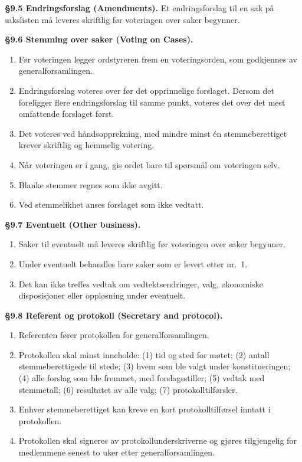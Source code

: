 \documentclass{../../../Common/Latex/Templates/rapport}
\begin{document}
\textbf{\S 9.5 Endringsforslag (Amendments).}\label{bylaw:9.5} Et endringsforslag til en sak på sakslisten må leveres skriftlig før voteringen over saker begynner.

\textbf{\S 9.6 Stemming over saker (Voting on Cases).}\label{bylaw:9.6}
\begin{enumerate}
  \item Før voteringen legger ordstyreren frem en voteringsorden, som godkjennes av generalforsamlingen.
  \item Endringsforslag voteres over før det opprinnelige forslaget. Dersom det foreligger flere endringsforslag til samme punkt, voteres det over det mest omfattende forslaget først.
  \item Det voteres ved håndsopprekning, med mindre minst én stemmeberettiget krever skriftlig og hemmelig votering.
  \item Når voteringen er i gang, gis ordet bare til spørsmål om voteringen selv.
  \item Blanke stemmer regnes som ikke avgitt.
  \item Ved stemmelikhet anses forslaget som ikke vedtatt.
\end{enumerate}

\textbf{\S 9.7 Eventuelt (Other business).}\label{bylaw:9.7}
\begin{enumerate}
  \item Saker til eventuelt må leveres skriftlig før voteringen over saker begynner.
  \item Under eventuelt behandles bare saker som er levert etter nr.\ 1.
  \item Det kan ikke treffes vedtak om vedtektsendringer, valg, økonomiske disposisjoner eller oppløsning under eventuelt.
\end{enumerate}

\textbf{\S 9.8 Referent og protokoll (Secretary and protocol).}\label{bylaw:9.8}
\begin{enumerate}
  \item Referenten fører protokollen for generalforsamlingen.
  \item Protokollen skal minst inneholde: (1) tid og sted for møtet; (2) antall stemmeberettigede til stede; (3) hvem som ble valgt under konstitueringen; (4) alle forslag som ble fremmet, med forslagsstiller; (5) vedtak med stemmetall; (6) resultatet av alle valg; (7) protokolltilførsler.
  \item Enhver stemmeberettiget kan kreve en kort protokolltilførsel inntatt i protokollen.
  \item Protokollen skal signeres av protokollunderskriverne og gjøres tilgjengelig for medlemmene senest to uker etter generalforsamlingen.
\end{enumerate}
\end{document}
